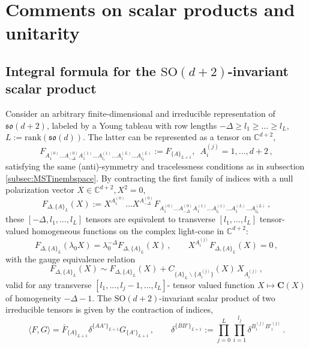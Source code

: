 \documentclass{article}
\def \Dg {\Delta}
\def \dg {\delta}
\def \la {\lambda}
\def \Cs {\mathbb{C}}
\newcommand\vct[1]{\mathbf{#1}}
\begin{document}
\section{Comments on scalar products and unitarity}
\label{app:scalar_product}
\subsection{Integral formula for the \texorpdfstring{$\mathrm{SO}(d+2)$}{SO(d+2)}-invariant scalar product}
\label{ssec:BargmannTodorov}
Consider an arbitrary finite-dimensional and irreducible representation of $\mathfrak{so}(d+2)$, labeled by a Young tableau with row lengths $-\Dg \geq l_1 \geq \dots \geq l_L$, $L:= \mathrm{rank}(\mathfrak{so}(d))$. The latter can be represented as a tensor on $\Cs^{d+2}$,
\begin{equation}
    F_{A^{(0)}_1\dots A^{(0)}_{-\Dg}A^{(1)}_1\dots A^{(1)}_{l_1} \dots A^{(L)}_1 \dots A^{(L)}_{l_L}} := F_{\{ A\}_{L+1}}, \,\,\, A_{i}^{(j)} = 1,\dots, d+2\,,
\end{equation}
satisfying the same (anti)-symmetry and tracelessness conditions as in subsection \ref{subsec:MSTinembspace}. By contracting the first family of indices with a null polarization vector $X \in \Cs^{d+2}, X^2=0$,
\begin{equation}
    F_{\Dg,\{A\}_L}(X) :=   X^{{A^{(0)}_1}} \dots X^{A^{(0)}_{-\Dg}} F_{A^{(0)}_1\dots A^{(0)}_{-\Dg}A^{(1)}_1\dots A^{(1)}_{l_1} \dots A^{(L)}_1 \dots A^{(L)}_{l_L}}\,,
\end{equation}
these $[-\Dg,l_1,\dots,l_L]$ tensors are equivalent to transverse $[l_1,\dots,l_L]$ tensor-valued homogeneous functions on the complex light-cone in $\Cs^{d+2}$: 
\begin{equation}
    F_{\Dg,\{A\}_L}(\la_0 X) = \la_0^{-\Dg} F_{\Dg,\{A\}_L}(X)\,, \qquad X^{A^{(j)}_i} F_{\Dg,\{A\}_L}(X) = 0\,,
\end{equation}
with the gauge equivalence relation 
\begin{equation}
 F_{\Dg,\{A\}_L}(X) \sim  F_{\Dg,\{A\}_L}(X) + C_{\{A\}_L\backslash \{A_i^{(j)}\}} (X)\, X_{A_i^{(j)}}\,, 
\end{equation}
valid for any transverse $[l_1,\dots,l_j-1,\dots,l_L]$- tensor valued function $X\mapsto \vct{C}(X)$ of homogeneity $-\Delta-1$.
The $\mathrm{SO}(d+2)$-invariant scalar product of two irreducible tensors is given by the contraction of indices,
\begin{equation}
    \langle F,G \rangle = \bar{F}_{\{A\}_{L+1}} \dg^{\{AA'\}_{L+1}} G_{\{A'\}_{L+1}}\,, \qquad \dg^{\{BB'\}_{L+1}} := \prod_{j=0}^{L} \prod_{i=1}^{l_j} \dg^{B_i^{(j)} {B'}_i^{(j)}} \,.
\end{equation}
\end{document}
